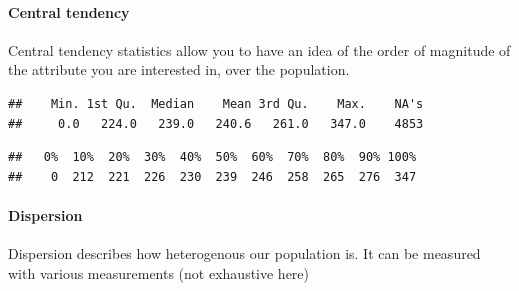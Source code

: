 \documentclass[
]{book}
\newenvironment{Shaded}{\begin{snugshade}}{\end{snugshade}}
\newcommand{\CommentTok}[1]{\textcolor[rgb]{0.56,0.35,0.01}{\textit{#1}}}
\newcommand{\DataTypeTok}[1]{\textcolor[rgb]{0.13,0.29,0.53}{#1}}
\newcommand{\DecValTok}[1]{\textcolor[rgb]{0.00,0.00,0.81}{#1}}
\newcommand{\KeywordTok}[1]{\textcolor[rgb]{0.13,0.29,0.53}{\textbf{#1}}}
\newcommand{\NormalTok}[1]{#1}
\newcommand{\OperatorTok}[1]{\textcolor[rgb]{0.81,0.36,0.00}{\textbf{#1}}}
\begin{document}
\hypertarget{central-tendency}{%
\paragraph{Central tendency}\label{central-tendency}}

Central tendency statistics allow you to have an idea of the order of magnitude of the attribute you are interested in, over the population.

\begin{Shaded}
\end{Shaded}

\begin{verbatim}
##    Min. 1st Qu.  Median    Mean 3rd Qu.    Max.    NA's 
##     0.0   224.0   239.0   240.6   261.0   347.0    4853
\end{verbatim}

\begin{Shaded}
\end{Shaded}

\begin{verbatim}
##   0%  10%  20%  30%  40%  50%  60%  70%  80%  90% 100% 
##    0  212  221  226  230  239  246  258  265  276  347
\end{verbatim}

\hypertarget{dispersion}{%
\paragraph{Dispersion}\label{dispersion}}

Dispersion describes how heterogenous our population is. It can be measured with various measurements (not exhaustive here)

\begin{Shaded}
\end{Shaded}
\end{document}
